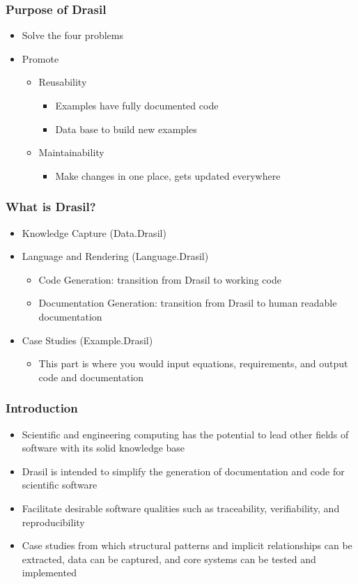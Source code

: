\documentclass{beamer}
\begin{document}
\begin{frame}
\frametitle{Purpose of Drasil}
\begin{itemize}
 \item Solve the four problems
 \item Promote
  \begin{itemize}
   \item Reusability 
    \begin{itemize}  
     \item Examples have fully documented code
     \item Data base to build new examples
    \end{itemize}
   \item Maintainability 
    \begin{itemize}
     \item Make changes in one place, gets updated everywhere
    \end{itemize}
  \end{itemize}
\end{itemize}
\end{frame}

\begin{frame}
\frametitle{What is Drasil?}
\begin{itemize}
 \item<1-> Knowledge Capture (Data.Drasil)
 \item<2-> Language and Rendering (Language.Drasil)
  \begin{itemize}
   \item Code Generation: transition from Drasil to working code
   \item Documentation Generation: transition from Drasil to human readable documentation
  \end{itemize}
 \item<3-> Case Studies (Example.Drasil)
  \begin{itemize}
   \item This part is where you would input equations, requirements, and output code and documentation
  \end{itemize}
\end{itemize}
\end{frame}

\begin{frame}
\frametitle{Introduction}
\begin{itemize}
 \item<1-> Scientific and engineering computing has the potential to lead other fields of software with its solid knowledge base
 \item<2-> Drasil is intended to simplify the generation of documentation and code for scientific software
 \item<3-> Facilitate desirable software qualities such as traceability, verifiability, and reproducibility
 \item<4-> Case studies from which structural patterns and implicit relationships can be extracted, data can be captured, and core systems can be tested and implemented
\end{itemize}
\end{frame}
\end{document}
